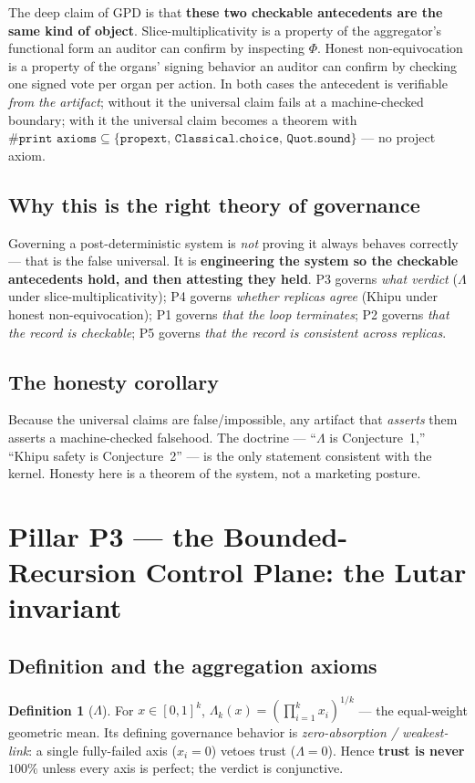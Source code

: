 \documentclass[11pt,letterpaper]{article}
\theoremstyle{definition}
\newtheorem{definition}[theorem]{Definition}
\newcommand{\Lam}{\Lambda}
\newcommand{\Ucoreaxioms}{\{\texttt{propext},\,\texttt{Classical.choice},\,\texttt{Quot.sound}\}}
\begin{document}
The deep claim of GPD is that \textbf{these two checkable antecedents are the
same kind of object}. Slice-multiplicativity is a property of the aggregator's
functional form an auditor can confirm by inspecting $\Phi$. Honest
non-equivocation is a property of the organs' signing behavior an auditor can
confirm by checking one signed vote per organ per action. In both cases the
antecedent is verifiable \emph{from the artifact}; without it the universal claim
fails at a machine-checked boundary; with it the universal claim becomes a
theorem with $\texttt{\#print axioms} \subseteq \Ucoreaxioms$ --- no project
axiom.

\subsection{Why this is the right theory of governance}
Governing a post-deterministic system is \emph{not} proving it always behaves
correctly --- that is the false universal. It is \textbf{engineering the system so
the checkable antecedents hold, and then attesting they held}. P3 governs
\emph{what verdict} ($\Lam$ under slice-multiplicativity); P4 governs
\emph{whether replicas agree} (Khipu under honest non-equivocation); P1 governs
\emph{that the loop terminates}; P2 governs \emph{that the record is checkable};
P5 governs \emph{that the record is consistent across replicas}.

\subsection{The honesty corollary}
Because the universal claims are false/impossible, any artifact that
\emph{asserts} them asserts a machine-checked falsehood. The doctrine ---
``$\Lam$ is Conjecture~1,'' ``Khipu safety is Conjecture~2'' --- is the only
statement consistent with the kernel. Honesty here is a theorem of the system,
not a marketing posture.

\section{Pillar P3 --- the Bounded-Recursion Control Plane: the Lutar invariant}\label{sec:p3}

\subsection{Definition and the aggregation axioms}
\begin{definition}[$\Lam$]
For $x\in[0,1]^k$, $\Lam_k(x) = \left(\prod_{i=1}^{k} x_i\right)^{1/k}$ --- the
equal-weight geometric mean. Its defining governance behavior is
\emph{zero-absorption / weakest-link}: a single fully-failed axis ($x_i=0$)
vetoes trust ($\Lam=0$). Hence \textbf{trust is never $100\%$} unless every axis
is perfect; the verdict is conjunctive.
\end{definition}
\end{document}
